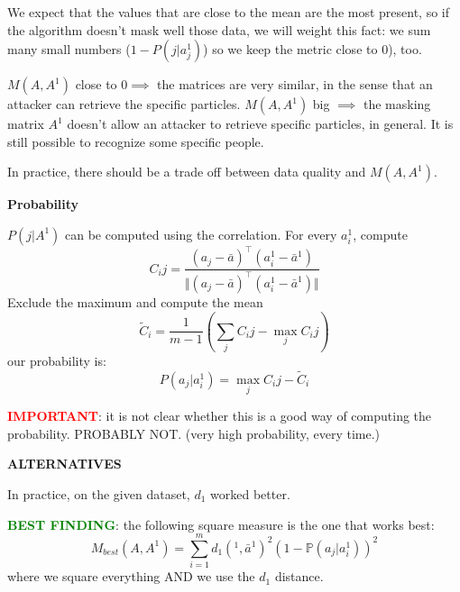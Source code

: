 \documentclass{article}
\renewcommand{\P}{\mathbb{P}}
\begin{document}
We expect that the values that are close to the mean are the most present, so if the algorithm doesn't mask well those data, we will weight this fact: we sum many small numbers ($1-P(j| a_j^1)$) so we keep the metric close to $0$), too.

$M(A,A^1)$ close to $0 \implies $ the matrices are very similar, in the sense that an attacker can retrieve the specific particles. $M(A,A^1)$ big $\implies$ the masking matrix $A^1$ doesn't allow an attacker to retrieve specific particles, in general. It is still possible to recognize some specific people.

In practice, there should be a trade off between data quality and $M(A,A^1)$.

\textbf{Probability}

$P(j | A^1)$ can be computed using the correlation.
For every $a^1_i$, compute
\begin{equation}
	C_ij = \frac{(a_j - \bar{a})^\top (a^1_i - \bar{a}^1)}{\Vert (a_j - \bar{a})^\top (a^1_i - \bar{a}^1) \Vert}
\end{equation}
Exclude the maximum and compute the mean
\begin{equation}
	\tilde{C}_i = \frac{1}{m-1} (\sum_{j} C_ij - \max_j C_ij)
\end{equation}
our probability is:
\begin{equation}
	P(a_j | a_i^1) = \max_j C_ij - \tilde{C}_i
\end{equation}

\textcolor{red}{\textbf{IMPORTANT}}: it is not clear whether this is a good way of computing the probability. PROBABLY NOT. (very high probability, every time.)

\textbf{ALTERNATIVES}

In practice, on the given dataset, $d_1$ worked better.

\textcolor{green}{\textbf{BEST FINDING}}: the following square measure is the one that works best:
\begin{equation}
	M_{best}(A, A^1) = \sum_{i=1}^{m} d_1(^1, \bar{a}^1)^2 (1 - \P(a_j | a_i^1) )^2
\end{equation}
where we square everything AND we use the $d_1$ distance.
\end{document}
